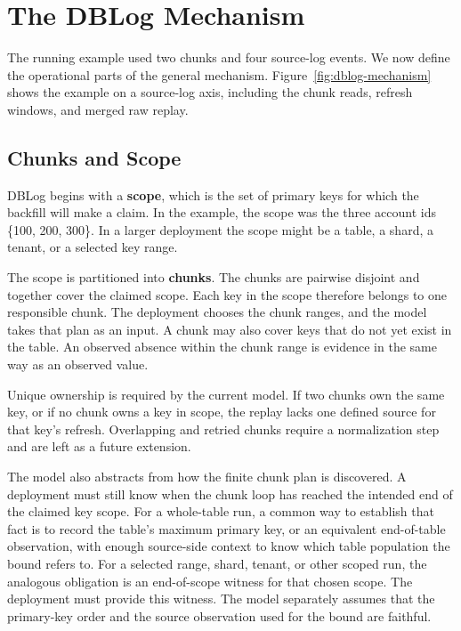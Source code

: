 \documentclass[letterpaper,10pt,twocolumn]{article}
\begin{document}
\section{The DBLog Mechanism}\label{the-dblog-mechanism}

The running example used two chunks and four source-log events. We now
define the operational parts of the general mechanism. Figure~\ref{fig:dblog-mechanism}
shows the example on a source-log axis, including the chunk reads,
refresh windows, and merged raw replay.

\begin{figure}[t]
  
\end{figure}

\subsection{Chunks and Scope}\label{chunks-and-scope}

DBLog begins with a \textbf{scope}, which is the set of primary keys for
which the backfill will make a claim. In the example, the scope was the three
account ids \{100, 200, 300\}. In a larger deployment the scope might be
a table, a shard, a tenant, or a selected key range.

The scope is partitioned into \textbf{chunks}. The chunks are pairwise
disjoint and together cover the claimed scope. Each key in the scope
therefore belongs to one responsible chunk. The deployment chooses the
chunk ranges, and the model takes that plan as an input. A chunk may
also cover keys that do not yet exist in the table. An observed absence
within the chunk range is evidence in the same way as an observed value.

Unique ownership is required by the current model. If two chunks own
the same key, or if no chunk owns a key in scope, the replay lacks one
defined source for that key's refresh. Overlapping and retried chunks
require a normalization step and are left as a future extension.

The model also abstracts from how the finite chunk plan is discovered.
A deployment must still know when the chunk loop has reached the
intended end of the claimed key scope. For a whole-table run, a common
way to establish that fact is to record the table's maximum primary key,
or an equivalent end-of-table observation, with enough source-side
context to know which table population the bound refers to. For a
selected range, shard, tenant, or other scoped run, the analogous
obligation is an end-of-scope witness for that chosen scope. The
deployment must provide this witness. The model separately assumes that
the primary-key order and the source observation used for the bound are
faithful.
\end{document}
